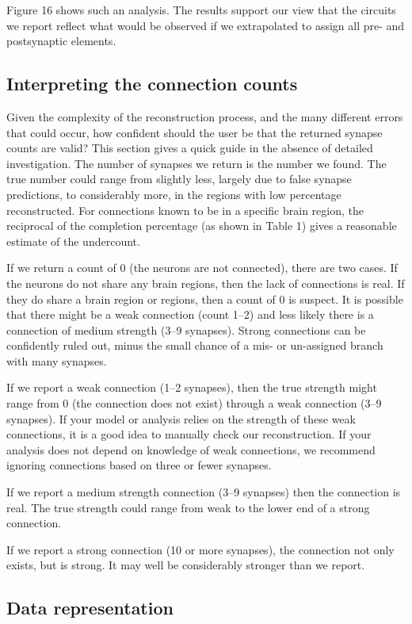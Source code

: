 \documentclass{article}
\begin{document}
Figure 16 shows such an analysis. The results support our view that the circuits we report reflect what would be observed if we extrapolated to assign all pre- and postsynaptic elements.

\subsection*{Interpreting the connection counts}

Given the complexity of the reconstruction process, and the many different errors that could occur, how confident should the user be that the returned synapse counts are valid? This section gives a quick guide in the absence of detailed investigation. The number of synapses we return is the number we found. The true number could range from slightly less, largely due to false synapse predictions, to considerably more, in the regions with low percentage reconstructed. For connections known to be in a specific brain region, the reciprocal of the completion percentage (as shown in Table 1) gives a reasonable estimate of the undercount.

If we return a count of 0 (the neurons are not connected), there are two cases. If the neurons do not share any brain regions, then the lack of connections is real. If they do share a brain region or regions, then a count of 0 is suspect. It is possible that there might be a weak connection (count 1–2) and less likely there is a connection of medium strength (3–9 synapses). Strong connections can be confidently ruled out, minus the small chance of a mis- or un-assigned branch with many synapses.

If we report a weak connection (1–2 synapses), then the true strength might range from 0 (the connection does not exist) through a weak connection (3–9 synapses). If your model or analysis relies on the strength of these weak connections, it is a good idea to manually check our reconstruction. If your analysis does not depend on knowledge of weak connections, we recommend ignoring connections based on three or fewer synapses.

If we report a medium strength connection (3–9 synapses) then the connection is real. The true strength could range from weak to the lower end of a strong connection.

If we report a strong connection (10 or more synapses), the connection not only exists, but is strong. It may well be considerably stronger than we report.

\subsection*{Data representation}
\end{document}

